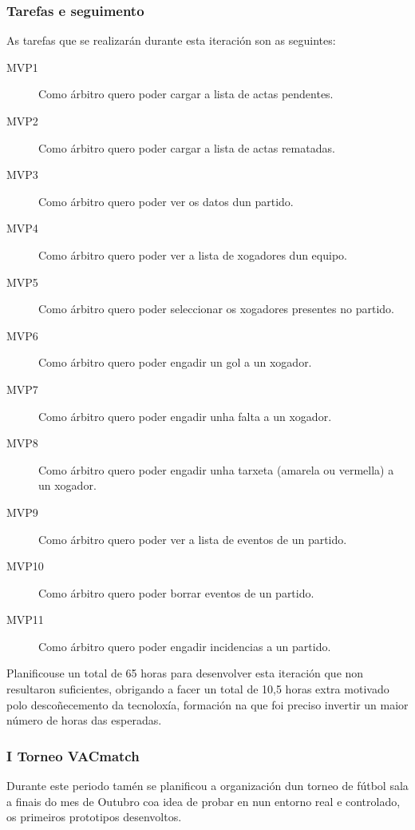       \subsubsection{Tarefas e seguimento}

      As tarefas que se realizarán durante esta iteración son as seguintes:

        \begin{description}
        \item [MVP1] Como árbitro quero poder cargar a lista de actas pendentes.
        \item [MVP2] Como árbitro quero poder cargar a lista de actas rematadas.
        \item [MVP3]Como árbitro quero poder ver os datos dun partido.
        \item [MVP4]Como árbitro quero poder ver a lista de xogadores dun 
equipo.
        \item [MVP5] Como árbitro quero poder seleccionar os xogadores 
presentes no partido.
        \item [MVP6] Como árbitro quero poder engadir un gol a un xogador.
        \item [MVP7] Como árbitro quero poder engadir unha falta a un xogador.
        \item [MVP8] Como árbitro quero poder engadir unha tarxeta (amarela ou 
vermella) a un xogador.
        \item [MVP9] Como árbitro quero poder ver a lista de eventos de un 
partido.
        \item [MVP10] Como árbitro quero poder borrar eventos de un partido.
        \item [MVP11] Como árbitro quero poder engadir incidencias a un partido.
       \end{description}

      Planificouse un total de 65 horas para desenvolver esta iteración que non 
resultaron suficientes, obrigando a facer un total de 10,5 horas extra motivado 
polo descoñecemento da tecnoloxía, formación na que foi preciso invertir un 
maior número de horas das esperadas.

    \subsubsection{I Torneo VACmatch}
    \label{sec:torneo_vacmatch}
    Durante este periodo tamén se planificou a organización dun torneo de 
  fútbol sala a finais do mes de Outubro coa idea de probar en nun entorno real 
  e controlado, os primeiros prototipos desenvoltos.

